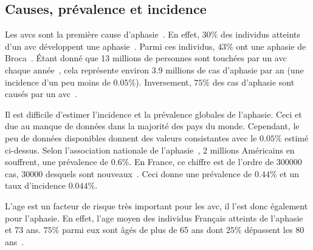 \subsection{Causes, prévalence et incidence}

Les \glspl{avc} sont la première cause d'aphasie~\cite{Hallowell_2017}.
En effet, \(30\%\) des individus atteints d'un \gls{avc} 
développent une aphasie~\cite{Flowers_Skoretz_Silver_Rochon_Fang_Flamand-Roze_Martino_2016}.
Parmi ces individus, \(43\%\) ont une aphasie de Broca~\cite{CNSA_2015}.
Étant donné que 13 millions de personnes sont touchées par un \gls{avc} 
chaque année~\cite{Smaili_Langlois_Pribil_2022},
cela représente environ \(3.9\) millions de cas d'aphasie par an (une incidence d'un peu moins de \(0.05\%\)).
Inversement, \(75\%\) des cas d'aphasie sont causés par un \gls{avc}~\cite{CNSA_2015}.

Il est difficile d'estimer l'incidence et la prévalence globales de l'aphasie.
Ceci et due au manque de données dans la majorité des pays du monde.
Cependant, le peu de données disponibles donnent des valeurs consistantes avec le \(0.05\%\) estimé ci-dessus.
Selon l'association nationale de l'aphasie~\cite{Home}, 2 millions Américains en souffrent, 
une prévalence de \(0.6\%\).
En France, ce chiffre est de l'ordre de 300000 cas, 30000 desquels sont nouveaux~\cite{CNSA_2015}.
Ceci donne une prévalence de \(0.44\%\) et un taux d'incidence \(0.044\%\).

L'age est un facteur de risque très important pour les \gls{avc},
il l'est donc également pour l'aphasie. 
En effet, l'age moyen des individus Français atteints de l'aphasie et 73 ans.
\(75\%\) parmi eux sont âgés de plus de 65 ans dont \(25\%\) dépassent les 80 ans~\cite{CNSA_2015}.






